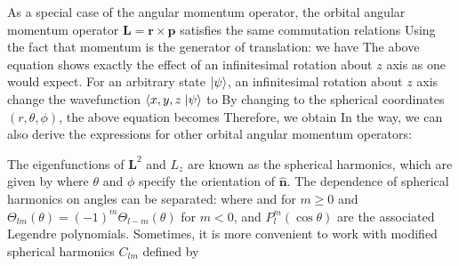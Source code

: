 As a special case of the angular momentum operator, the orbital angular momentum operator 
$\mathbf{L} = \mathbf{r} \times \mathbf{p}$ satisfies the same commutation relations
Using the fact that momentum is the generator of translation:
 we have
The above equation shows exactly the effect of an infinitesimal rotation about $z$ axis as one would expect. For an 
arbitrary state $| \psi \rangle$, an infinitesimal rotation about $z$ axis change the wavefunction $\left\langle x, y, z \right.| \psi \rangle$ to 
By changing to the spherical coordinates $(r, \theta, \phi)$, the above equation becomes
Therefore, we obtain
In the way, we can also derive the expressions for other orbital angular momentum operators:


The eigenfunctions of $\mathbf{L}^2$ and $L_z$ are known as the spherical harmonics, which are given by
where $\theta$ and $\phi$ specify the orientation of $\mathbf{\hat{n}}$. The dependence of spherical harmonics on 
angles can be separated:
where
and 
for $m\ge 0$ and $\Theta_{lm}(\theta) =(-1)^{m} \Theta_{l-m}(\theta) $ for $m<0$, and $P_l^{m}(\cos\theta)$ are the 
associated Legendre polynomials. Sometimes, it is more convenient
to work with modified spherical harmonics $C_{lm}$ defined by

